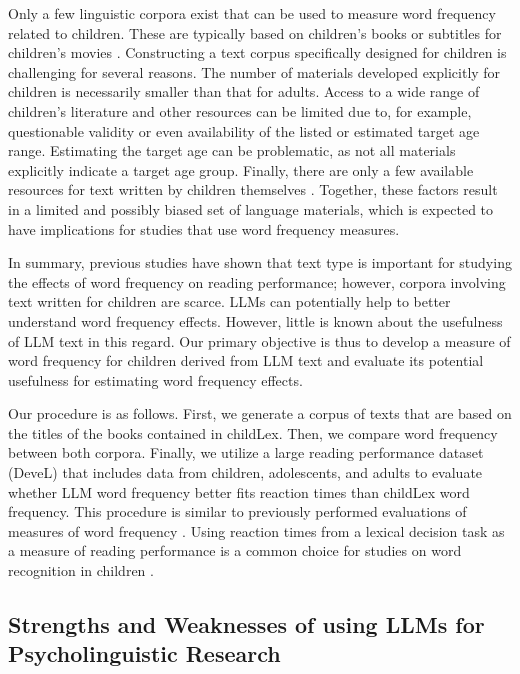 \documentclass[doc, a4paper, anonymous]{apa7}
\begin{document}
Only a few linguistic corpora exist that can be used to measure word frequency related to children. These are typically based on children's books or subtitles for children's movies \citep{schroeder_childlex_2015, tellings_basilex_2014, van_heuven_subtlex-uk_2014, Korochkina_2024}. Constructing a text corpus specifically designed for children is challenging for several reasons. The number of materials developed explicitly for children is necessarily smaller than that for adults. Access to a wide range of children's literature and other resources can be limited due to, for example, questionable validity or even availability of the listed or estimated target age range. Estimating the target age can be problematic, as not all materials explicitly indicate a target age group. Finally, there are only a few available resources for text written by children themselves \citep[see, e.g.,][]{laarmann-quante_litkey_2019}. Together, these factors result in a limited and possibly biased set of language materials, which is expected to have implications for studies that use word frequency measures. 

In summary, previous studies have shown that text type is important for studying the effects of word frequency on reading performance; however, corpora involving text written for children are scarce. LLMs can potentially help to better understand word frequency effects. However, little is known about the usefulness of LLM text in this regard. Our primary objective is thus to develop a measure of word frequency for children derived from LLM text and evaluate its potential usefulness for estimating word frequency effects. 

Our procedure is as follows. First, we generate a corpus of texts that are based on the titles of the books contained in childLex. Then, we compare word frequency between both corpora. Finally, we utilize a large reading performance dataset (DeveL) that includes data from children, adolescents, and adults \citep{schroter_developmental_2017} to evaluate whether LLM word frequency better fits reaction times than childLex word frequency. This procedure is similar to previously performed evaluations of measures of word frequency \citep[e.g.,][]{brysbaert_word_2011, brysbaert_word_2018}. Using reaction times from a lexical decision task as a measure of reading performance is a common choice for studies on word recognition in children \citep{davies_reading_2017, monster_word_2022, van_den_boer_lexical_2012}. 


\subsection*{Strengths and Weaknesses of using LLMs for Psycholinguistic Research}
\end{document}
